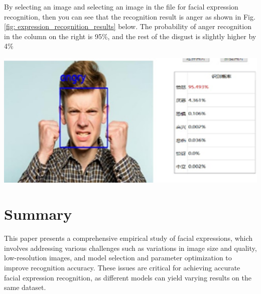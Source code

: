 \documentclass[a0,portrait]{a0poster}
\begin{document}
\begin{multicols}{2}
By selecting an image and selecting an image in the file for facial expression recognition, then you can see that the recognition result is anger as shown in Fig.\ref{fig: expression_recognition_results} below. The probability of anger recognition in the column on the right is 95\%, and the rest of the disgust is slightly higher by 4\%

\begin{center}\vspace{1cm}
	\includegraphics[width=0.5\linewidth]{expression_recognition_results}
\end{center}\vspace{1cm}



\section*{Summary}


\quad This paper presents a comprehensive empirical study of facial expressions, which involves addressing various challenges such as variations in image size and quality, low-resolution images, and model selection and parameter optimization to improve recognition accuracy. These issues are critical for achieving accurate facial expression recognition, as different models can yield varying results on the same dataset.




\end{multicols}
\end{document}
